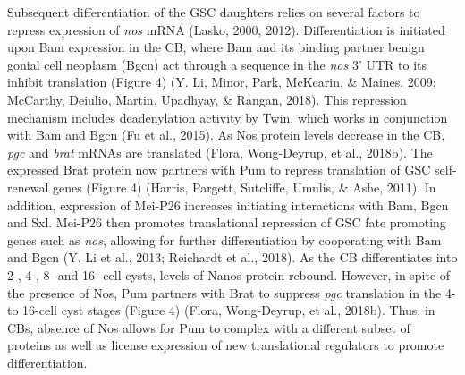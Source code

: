 \documentclass[12pt,oneside]{reedthesis}
\begin{document}
Subsequent differentiation of the GSC daughters relies on several
factors to repress expression of \emph{nos} mRNA (Lasko, 2000, 2012). Differentiation is initiated upon Bam expression in the
CB, where Bam and its binding partner benign gonial cell neoplasm (Bgcn)
act through a sequence in the \emph{nos} 3' UTR to its inhibit translation
(Figure 4) (Y. Li, Minor, Park, McKearin, \& Maines, 2009; McCarthy, Deiulio, Martin, Upadhyay, \& Rangan, 2018). This repression mechanism
includes deadenylation activity by Twin, which works in conjunction with
Bam and Bgcn (Fu et al., 2015). As Nos protein levels decrease in the CB,
\emph{pgc} and \emph{brat} mRNAs are translated (Flora, Wong-Deyrup, et al., 2018b). The expressed
Brat protein now partners with Pum to repress translation of GSC
self-renewal genes (Figure 4) (Harris, Pargett, Sutcliffe, Umulis, \& Ashe, 2011). In addition, expression
of Mei-P26 increases initiating interactions with Bam, Bgcn and Sxl.
Mei-P26 then promotes translational repression of GSC fate promoting
genes such as \emph{nos}, allowing for further differentiation by cooperating
with Bam and Bgcn (Y. Li et al., 2013; Reichardt et al., 2018). As the CB
differentiates into 2-, 4-, 8- and 16- cell cysts, levels of Nanos
protein rebound. However, in spite of the presence of Nos, Pum partners
with Brat to suppress \emph{pgc} translation in the 4- to 16-cell cyst stages
(Figure 4) (Flora, Wong-Deyrup, et al., 2018b). Thus, in CBs, absence of Nos allows for Pum
to complex with a different subset of proteins as well as license
expression of new translational regulators to promote differentiation.
\end{document}
